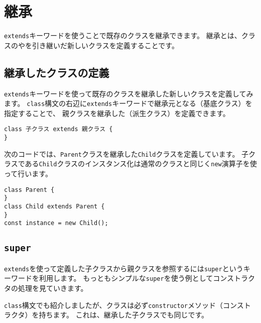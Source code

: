 \hypertarget{extends}{%
\section{継承}\label{extends}}

\texttt{extends}キーワードを使うことで既存のクラスを継承できます。
継承とは、クラスの\textbf{}や\textbf{}を引き継いだ新しいクラスを定義することです。

\hypertarget{class-extends}{%
\subsection{継承したクラスの定義}\label{class-extends}}

\texttt{extends}キーワードを使って既存のクラスを継承した新しいクラスを定義してみます。
\texttt{class}構文の右辺に\texttt{extends}キーワードで継承元となる\textbf{}（基底クラス）を指定することで、
親クラスを継承した\textbf{}（派生クラス）を定義できます。

\begin{lstlisting}
class 子クラス extends 親クラス {
}
\end{lstlisting}

次のコードでは、\texttt{Parent}クラスを継承した\texttt{Child}クラスを定義しています。
子クラスである\texttt{Child}クラスのインスタンス化は通常のクラスと同じく\texttt{new}演算子を使って行います。

\begin{lstlisting}
class Parent {
}
class Child extends Parent {
}
const instance = new Child();
\end{lstlisting}

\hypertarget{class-super}{%
\subsection{\texorpdfstring{\texttt{super}}{super}}\label{class-super}}

\texttt{extends}を使って定義した子クラスから親クラスを参照するには\texttt{super}というキーワードを利用します。
もっともシンプルな\texttt{super}を使う例としてコンストラクタの処理を見ていきます。

\texttt{class}構文でも紹介しましたが、クラスは必ず\texttt{constructor}メソッド（コンストラクタ）を持ちます。
これは、継承した子クラスでも同じです。

